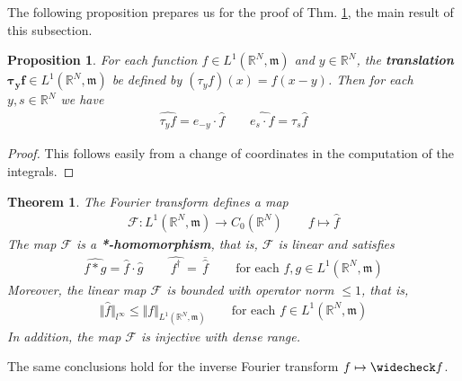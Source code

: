 \documentclass[12pt,b5paper,notitlepage]{article}
\theoremstyle{definition}
\theoremstyle{plain}
\newtheorem{thm}[df]{Theorem}
\newtheorem{pp}[df]{Proposition}
\newcommand{\wht}{\widehat}
\newcommand{\wch}{\widecheck}
\newcommand{\ovl}{\overline}
\newcommand{\Rbb}{\mathbb R}
\newcommand{\mk}{\mathfrak m}
\newcommand{\MF}{\mathcal F}
\numberwithin{equation}{section}
\begin{document}
The following proposition prepares us for the proof of Thm. \ref{lb516}, the main result of this subsection.

\begin{pp}\label{lb510}
For each function $f\in L^1(\Rbb^N,\mk)$ and $y\in\Rbb^N$, the \textbf{translation} $\pmb{\tau_yf}\in L^1(\Rbb^N,\mk)$  be defined by $(\tau_yf)(x)=f(x-y)$. Then for each $y,s\in\Rbb^N$ we have
\begin{gather*}
\wht{\tau_yf}=e_{-y}\cdot\wht f\qquad \wht{e_s\cdot f}=\tau_s\wht f
\end{gather*} 
\end{pp}

\begin{proof}
This follows easily from a change of coordinates in the computation of the integrals.
\end{proof}



\begin{thm}\label{lb516}
The Fourier transform defines a map
\begin{gather}
\MF:L^1(\Rbb^N,\mk)\rightarrow C_0(\Rbb^N)\qquad f\mapsto \wht f \label{eq256}
\end{gather}
The map $\MF$ is a \textbf{*-homomorphism},  that is, $\MF$ is linear and satisfies
\begin{align}\label{eq254}
\wht{f*g}=\wht f\cdot\wht g\qquad \wht{\,f^\dagger\,}=\ovl{\,\wht f\,}\qquad\text{for each }f,g\in L^1(\Rbb^N,\mk)
\end{align}
Moreover, the linear map $\MF$ is bounded with operator norm $\leq 1$, that is,
\begin{align}\label{eq252}
\Vert \wht f\Vert_{l^\infty}\leq\Vert f\Vert_{L^1(\Rbb^N,\mk)}\qquad \text{for each }f\in L^1(\Rbb^N,\mk)
\end{align}
In addition, the map $\MF$ is injective with dense range. 
\end{thm}

The same conclusions hold for the inverse Fourier transform $f\mapsto\wch f$.
\end{document}
